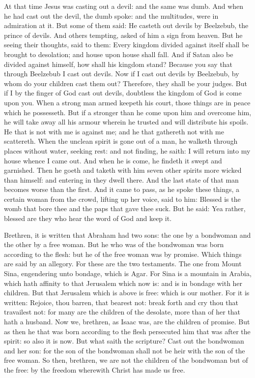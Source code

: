 

At that time Jesus was casting out a devil: and the same was dumb. And when he had cast out
the devil, the dumb spoke: and the multitudes, were in admiration at it.  But
some of them said: He casteth out devils by Beelzebub, the prince of devils.
And others tempting, asked of him a sign from heaven.  But he seeing their
thoughts, said to them: Every kingdom divided against itself shall be brought
to desolation; and house upon house shall fall.  And if Satan also be divided
against himself, how shall his kingdom stand? Because you say that through
Beelzebub I cast out devils.  Now if I cast out devils by Beelzebub, by whom do
your children cast them out? Therefore, they shall be your judges.  But if I by
the finger of God cast out devils, doubtless the kingdom of God is come upon
you.  When a strong man armed keepeth his court, those things are in peace
which he possesseth.  But if a stronger than he come upon him and overcome him,
he will take away all his armour wherein he trusted and will distribute his
spoils.  He that is not with me is against me; and he that gathereth not with
me scattereth.  When the unclean spirit is gone out of a man, he walketh
through places without water, seeking rest: and not finding, he saith: I will
return into my house whence I came out.  And when he is come, he findeth it
swept and garnished.  Then he goeth and taketh with him seven other spirits
more wicked than himself: and entering in they dwell there. And the last state
of that man becomes worse than the first.  And it came to pass, as he spoke
these things, a certain woman from the crowd, lifting up her voice, said to
him: Blessed is the womb that bore thee and the paps that gave thee suck.  But
he said: Yea rather, blessed are they who hear the word of God and keep it.






Brethren, it is written that Abraham had two sons: the one by a bondwoman and the
other by a free woman.  But he who was of the bondwoman was born according to
the flesh: but he of the free woman was by promise.  Which things are said by
an allegory. For these are the two testaments. The one from Mount Sina,
engendering unto bondage, which is Agar.  For Sina is a mountain in Arabia,
which hath affinity to that Jerusalem which now is: and is in bondage with her
children.  But that Jerusalem which is above is free: which is our mother.  For
it is written: Rejoice, thou barren, that bearest not: break forth and cry thou
that travailest not: for many are the children of the desolate, more than of
her that hath a husband.  Now we, brethren, as Isaac was, are the children of
promise.  But as then he that was born according to the flesh persecuted him
that was after the spirit: so also it is now.  But what saith the scripture?
Cast out the bondwoman and her son: for the son of the bondwoman shall not be
heir with the son of the free woman.  So then, brethren, we are not the
children of the bondwoman but of the free: by the freedom wherewith Christ has
made us free.

